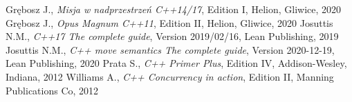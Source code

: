 \documentclass[../main]{subfiles}
\begin{document}
    \begin{thebibliography}{}
         Grębosz J., \emph{Misja w nadprzestrzeń C++14/17}, Edition I, Helion, Gliwice, 2020
         Grębosz J., \emph{Opus Magnum C++11}, Edition II, Helion, Gliwice, 2020
         Josuttis N.M., \emph{C++17 The complete guide}, Version 2019/02/16, Lean Publishing, 2019
         Josuttis N.M., \emph{C++ move semantics The complete guide}, Version 2020-12-19, Lean Publishing, 2020
         Prata S., \emph{C++ Primer Plus}, Edition IV, Addison-Wesley, Indiana, 2012
         Williams A., \emph{C++ Concurrency in action}, Edition II, Manning Publications Co, 2012
    \end{thebibliography}
\end{document}

